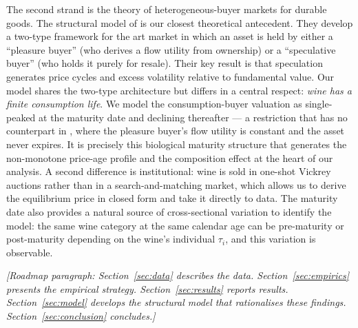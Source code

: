 The second strand is the theory of heterogeneous-buyer markets for durable goods. The
structural model of \citet{lovo2018} is our closest theoretical antecedent. They develop
a two-type framework for the art market in which an asset is held by either a ``pleasure
buyer'' (who derives a flow utility from ownership) or a ``speculative buyer'' (who holds
it purely for resale). Their key result is that speculation generates price cycles and
excess volatility relative to fundamental value. Our model shares the two-type architecture
but differs in a central respect: \textit{wine has a finite consumption life}. We model the
consumption-buyer valuation as single-peaked at the maturity date and declining thereafter
--- a restriction that has no counterpart in \citet{lovo2018}, where the pleasure buyer's
flow utility is constant and the asset never expires. It is precisely this biological
maturity structure that generates the non-monotone price-age profile and the composition
effect at the heart of our analysis. A second difference is institutional: wine is sold in
one-shot Vickrey auctions rather than in a search-and-matching market, which allows us to
derive the equilibrium price in closed form and take it directly to data. The maturity
date also provides a natural source of cross-sectional variation to identify the model: the
same wine category at the same calendar age can be pre-maturity or post-maturity depending
on the wine's individual $\tau_i$, and this variation is observable.

\noindent\textit{[Roadmap paragraph: Section~\ref{sec:data} describes the data.
Section~\ref{sec:empirics} presents the empirical strategy. Section~\ref{sec:results} reports
results. Section~\ref{sec:model} develops the structural model that rationalises these
findings. Section~\ref{sec:conclusion} concludes.]}
